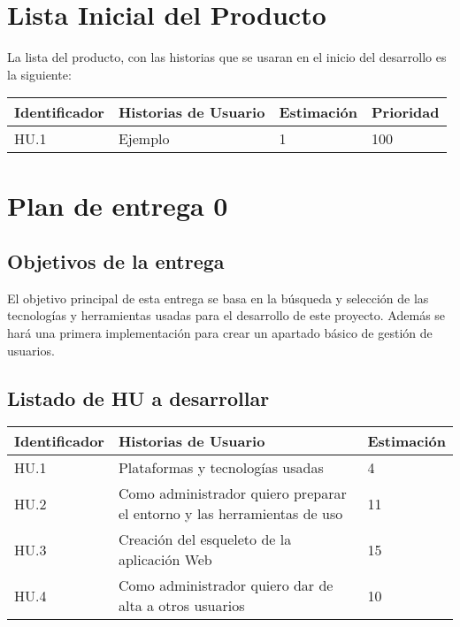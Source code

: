 \section{Lista Inicial del Producto}

La lista del producto, con las historias que se usaran en el inicio del desarrollo es la siguiente:\\

\begin{table}[h]
	\centering
	\begin{tabular}{| p{2.3cm} | p{5.1cm} | p{2cm} | p{1.6cm} |}
		\rowcolor[HTML]{329A9D} 
		{\color[HTML]{FFFFFF} \textbf{Identificador}} & {\color[HTML]{FFFFFF} \textbf{Historias de Usuario}} & {\color[HTML]{FFFFFF} \textbf{Estimación}} & {\color[HTML]{FFFFFF} \textbf{Prioridad}} \\ \hline
		HU.1 & Ejemplo & 1 & 100 \\         
		\hline              
	\end{tabular}
\end{table}

\section{Plan de entrega 0}

\subsection{Objetivos de la entrega}

El objetivo principal de esta entrega se basa en la búsqueda y selección de las tecnologías y herramientas usadas para el desarrollo de este proyecto. Además se hará una primera implementación para crear un apartado básico de gestión de usuarios.

\subsection{Listado de HU a desarrollar}

\begin{table}[h]
	\centering
	\begin{tabular}{| p{2.3cm} | p{6.7cm} | p{2cm} |}
		\rowcolor[HTML]{329A9D} 
		{\color[HTML]{FFFFFF} \textbf{Identificador}} & {\color[HTML]{FFFFFF} \textbf{Historias de Usuario}} & {\color[HTML]{FFFFFF} \textbf{Estimación}}  \\ \hline
		HU.1 & Plataformas y tecnologías usadas & 4 \\ \hline   
		HU.2 & Como administrador quiero preparar el entorno y las herramientas de uso & 11 \\ \hline   
		HU.3 & Creación del esqueleto de la aplicación Web & 15 \\ \hline
		HU.4 & Como administrador quiero dar de alta a otros usuarios & 10 \\ \hline
	\end{tabular}
\end{table}

